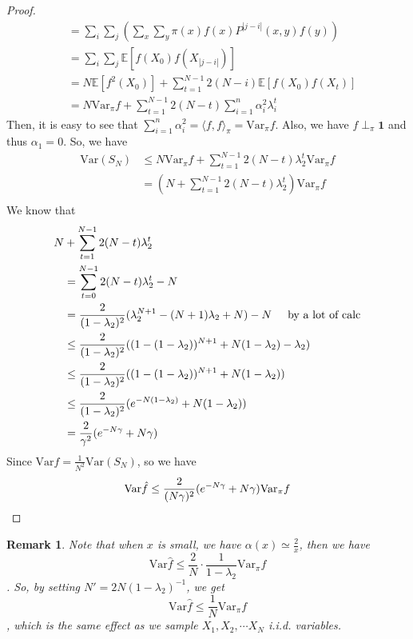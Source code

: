 \documentclass{article}
\newtheorem{remark}{Remark}[section]
\def\<{\langle}
\def\>{\rangle}
\begin{document}
\begin{proof}
\begin{align*}
    &= \sum_i \sum_j \left( \sum_x \sum_y \pi(x) f(x) P^{|j - i|}(x, y) f(y) \right)\\
    &= \sum_i \sum_j \mathbb{E}[f(X_0)f(X_{|j-i|})] \\
    &= N\mathbb{E}[f^2(X_0)] + \sum_{t=1}^{N-1} 2(N-i) \mathbb{E}[f(X_0)f(X_t)] \\
    &= N\mathrm{Var}_\pi f + \sum_{t=1}^{N-1} 2(N - t) \sum_{i=1}^n \alpha_i^2 \lambda_i^t
  \end{align*}
  Then, it is easy to see that $\sum_{i=1}^n \alpha_i^2 = \<f, f\>_\pi = \mathrm{Var}_\pi f$.
  Also, we have $f\perp_\pi \mathbf{1}$ and thus $\alpha_1 = 0$.
  So, we have
  \begin{align*}
    \mathrm{Var}(S_N)
    &\leq N\mathrm{Var}_\pi f + \sum_{t=1}^{N-1} 2(N-t) \lambda_2^t \mathrm{Var}_\pi f \\
    &= \left(N + \sum_{t=1}^{N-1} 2(N-t) \lambda_2^t\right) \mathrm{Var}_\pi f \\
  \end{align*}
  We know that
  \begin{align*}
    N &+ \sum_{t=1}^{N-1} 2(N-t) \lambda_2^t \\
      &= \sum_{t=0}^{N-1} 2(N-t) \lambda_2^t - N \\
      &= \frac{2}{(1 - \lambda_2)^2}(\lambda_2^{N+1} - (N+1)\lambda_2 + N) - N \hspace{0.5cm} \mbox{by a lot of calc} \\
      &\leq \frac{2}{(1 - \lambda_2)^2}((1 - (1-\lambda_2))^{N+1} + N(1-\lambda_2) - \lambda_2) \\
      &\leq \frac{2}{(1 - \lambda_2)^2}((1 - (1-\lambda_2))^{N+1} + N(1-\lambda_2)) \\
      &\leq \frac{2}{(1 - \lambda_2)^2} (e^{-N(1-\lambda_2)} + N(1 - \lambda_2)) \\
      &= \frac{2}{\gamma^2}(e^{-N\gamma} + N\gamma)
  \end{align*}
  Since $\mathrm{Var} \hat{f} = \frac{1}{N^2} \mathrm{Var}(S_N)$, so we have
  \[\mathrm{Var} \hat{f} \leq \frac{2}{(N\gamma)^2} (e^{-N\gamma} + N\gamma) \mathrm{Var}_\pi f \qedhere\]
\end{proof}

\begin{remark}
  Note that when $x$ is small, we have $\alpha(x) \simeq \frac{2}{x}$, then we have
  \[\mathrm{Var}\hat{f} \leq \frac{2}{N}\cdot \frac{1}{1 - \lambda_2} \mathrm{Var}_\pi f\].
  So, by setting $N' = 2N (1 - \lambda_2)^{-1}$, we get
  \[\mathrm{Var} \hat{f} \leq \frac{1}{N} \mathrm{Var}_\pi f\]
  , which is the same effect as we sample $X_1, X_2, \cdots X_N$ i.i.d. variables.
\end{remark}
\end{document}
